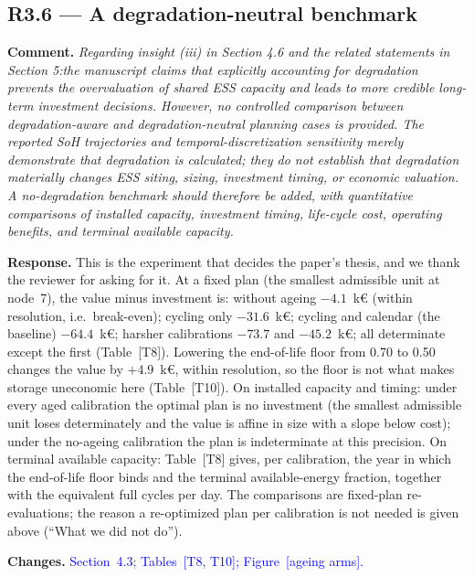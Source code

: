 \documentclass[11pt]{article}
\newcommand{\rcomment}[1]{\par\medskip\noindent\textbf{Comment.} \textit{#1}\par\smallskip}
\newcommand{\rresponse}[1]{\noindent\textbf{Response.} #1\par\smallskip}
\newcommand{\rchanges}[1]{\noindent\textbf{Changes.} \textcolor{blue}{#1}\par\medskip}
\begin{document}
\subsection*{R3.6 --- A degradation-neutral benchmark}
\rcomment{
Regarding insight (iii) in Section 4.6 and the related statements in Section 5:the manuscript claims that explicitly accounting for degradation prevents the overvaluation of shared ESS capacity and leads to more credible long-term investment decisions. However, no controlled comparison between degradation-aware and degradation-neutral planning cases is provided. The reported SoH trajectories and temporal-discretization sensitivity merely demonstrate that degradation is calculated; they do not establish that degradation materially changes ESS siting, sizing, investment timing, or economic valuation. A no-degradation benchmark should therefore be added, with quantitative comparisons of installed capacity, investment timing, life-cycle cost, operating benefits, and terminal available capacity.
}
\rresponse{This is the experiment that decides the paper's thesis, and we thank the reviewer for asking for
it. At a fixed plan (the smallest admissible unit at node~7), the value minus investment is: without
ageing $-4.1$~k\euro{} (within resolution, i.e.\ break-even); cycling only $-31.6$~k\euro{}; cycling and
calendar (the baseline) $-64.4$~k\euro{}; harsher calibrations $-73.7$ and $-45.2$~k\euro{}; all
determinate except the first (Table~[T8]). Lowering the end-of-life floor from 0.70 to 0.50 changes the
value by $+4.9$~k\euro{}, within resolution, so the floor is not what makes storage uneconomic here
(Table~[T10]). On installed capacity and timing: under every aged calibration the optimal plan is no
investment (the smallest admissible unit loses determinately and the value is affine in size with a slope
below cost); under the no-ageing calibration the plan is indeterminate at this precision. On terminal
available capacity: Table~[T8] gives, per calibration, the year in which the end-of-life floor binds and
the terminal available-energy fraction, together with the equivalent full cycles per day. The comparisons
are fixed-plan re-evaluations; the reason a re-optimized plan per calibration is not needed is given above
(``What we did not do'').}
\rchanges{Section~4.3; Tables~[T8, T10]; Figure~[ageing arms].}
\end{document}
